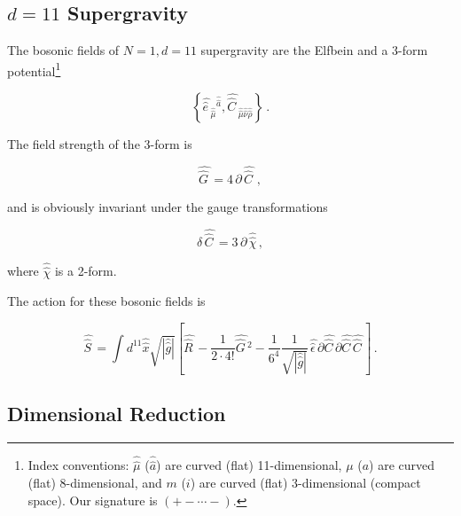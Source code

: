 \documentclass[12pt,a4paper]{article}
\begin{document}
\subsection{$d=11$ Supergravity}

The bosonic fields of $N=1,d=11$ supergravity are the Elfbein and a
3-form potential\footnote{Index conventions: $\hat{\hat{\mu}}$
  ($\hat{\hat{a}}$) are curved (flat) 11-dimensional, $\mu$ ($a$) are
  curved (flat) 8-dimensional, and $m$ ($i$) are curved (flat)
  3-dimensional (compact space). Our signature is $(+-\cdots-)$.}

\begin{equation}
\left\{\hat{\hat{e} \,}_{\hat{\hat{\mu}}}{}^{\hat{\hat{a}}},
\hat{\hat{C} \,}_{\hat{\hat{\mu}}\hat{\hat{\nu}}\hat{\hat{\rho}}}
\right\}\, .
\end{equation}

\noindent The field strength of the 3-form is

\begin{equation}
\hat{\hat{G} \,} = 4\, \partial\, \hat{\hat{C} \,}\, ,
\end{equation}

\noindent and is obviously invariant under the gauge transformations

\begin{equation}
\label{eq:3formgauge}
\delta\, \hat{\hat{C} \,}= 3\, \partial\, \hat{\hat{\chi}}\, ,
\end{equation}

\noindent where $\hat{\hat{\chi}}$ is a 2-form. 

\noindent The action for these bosonic fields is

\begin{equation}
\label{eq:action11}
 \hat{\hat{S} \,} = 
\int d^{11} \hat{\hat{x}} \sqrt{|\hat{\hat{g}}|}
 \left[ \hat{\hat{R} \,} -{\textstyle\frac{1}{2 \cdot 4!}}
\hat{\hat{G} \,}{}^{2}
 -{\textstyle\frac{1}{6^{4}}}
{\textstyle\frac{1}{\sqrt{|\hat{\hat{g}}|}}}\, \hat{\hat{\epsilon} \,}
\partial\hat{\hat{C} \,}\partial\hat{\hat{C} \,}\hat{\hat{C} \,} \right]\, .
\end{equation}

\subsection{Dimensional Reduction}
\end{document}
